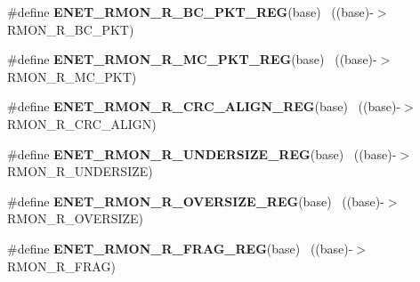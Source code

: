 \begin{DoxyCompactItemize}
\item 
\hypertarget{group___e_n_e_t___register___accessor___macros_ga6b6865cfca9911c36e422c745adad769}{}\#define {\bfseries E\+N\+E\+T\+\_\+\+R\+M\+O\+N\+\_\+\+R\+\_\+\+B\+C\+\_\+\+P\+K\+T\+\_\+\+R\+E\+G}(base)                      ~((base)-\/$>$R\+M\+O\+N\+\_\+\+R\+\_\+\+B\+C\+\_\+\+P\+K\+T)\label{group___e_n_e_t___register___accessor___macros_ga6b6865cfca9911c36e422c745adad769}

\item 
\hypertarget{group___e_n_e_t___register___accessor___macros_ga7a3505bb7a2bf7d502fecd2b37dddde0}{}\#define {\bfseries E\+N\+E\+T\+\_\+\+R\+M\+O\+N\+\_\+\+R\+\_\+\+M\+C\+\_\+\+P\+K\+T\+\_\+\+R\+E\+G}(base)                      ~((base)-\/$>$R\+M\+O\+N\+\_\+\+R\+\_\+\+M\+C\+\_\+\+P\+K\+T)\label{group___e_n_e_t___register___accessor___macros_ga7a3505bb7a2bf7d502fecd2b37dddde0}

\item 
\hypertarget{group___e_n_e_t___register___accessor___macros_ga31b0a0c46a3c38891899878411940bbb}{}\#define {\bfseries E\+N\+E\+T\+\_\+\+R\+M\+O\+N\+\_\+\+R\+\_\+\+C\+R\+C\+\_\+\+A\+L\+I\+G\+N\+\_\+\+R\+E\+G}(base)                ~((base)-\/$>$R\+M\+O\+N\+\_\+\+R\+\_\+\+C\+R\+C\+\_\+\+A\+L\+I\+G\+N)\label{group___e_n_e_t___register___accessor___macros_ga31b0a0c46a3c38891899878411940bbb}

\item 
\hypertarget{group___e_n_e_t___register___accessor___macros_ga7a7adff61d5676019bd0e847269985ab}{}\#define {\bfseries E\+N\+E\+T\+\_\+\+R\+M\+O\+N\+\_\+\+R\+\_\+\+U\+N\+D\+E\+R\+S\+I\+Z\+E\+\_\+\+R\+E\+G}(base)                ~((base)-\/$>$R\+M\+O\+N\+\_\+\+R\+\_\+\+U\+N\+D\+E\+R\+S\+I\+Z\+E)\label{group___e_n_e_t___register___accessor___macros_ga7a7adff61d5676019bd0e847269985ab}

\item 
\hypertarget{group___e_n_e_t___register___accessor___macros_ga2c9cd011c9df26e2e1208a2d357fd0e2}{}\#define {\bfseries E\+N\+E\+T\+\_\+\+R\+M\+O\+N\+\_\+\+R\+\_\+\+O\+V\+E\+R\+S\+I\+Z\+E\+\_\+\+R\+E\+G}(base)                  ~((base)-\/$>$R\+M\+O\+N\+\_\+\+R\+\_\+\+O\+V\+E\+R\+S\+I\+Z\+E)\label{group___e_n_e_t___register___accessor___macros_ga2c9cd011c9df26e2e1208a2d357fd0e2}

\item 
\hypertarget{group___e_n_e_t___register___accessor___macros_ga821ed742c8f6521d8d8750c70b6fd864}{}\#define {\bfseries E\+N\+E\+T\+\_\+\+R\+M\+O\+N\+\_\+\+R\+\_\+\+F\+R\+A\+G\+\_\+\+R\+E\+G}(base)                          ~((base)-\/$>$R\+M\+O\+N\+\_\+\+R\+\_\+\+F\+R\+A\+G)\label{group___e_n_e_t___register___accessor___macros_ga821ed742c8f6521d8d8750c70b6fd864}


\end{DoxyCompactItemize}
